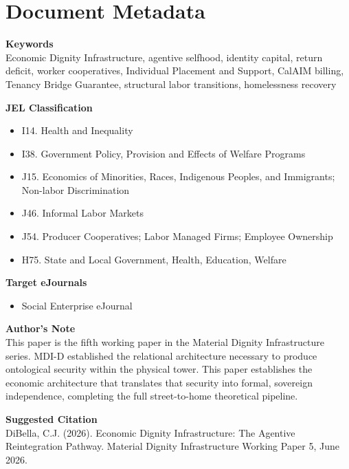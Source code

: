 \documentclass[12pt, letterpaper]{article}
\begin{document}
\section*{Document Metadata}

\noindent\textbf{Keywords}\\[1pt]
Economic Dignity Infrastructure, agentive selfhood, identity capital, return deficit, worker cooperatives, Individual Placement and Support, CalAIM billing, Tenancy Bridge Guarantee, structural labor transitions, homelessness recovery

\vspace{8pt}
\noindent\textbf{JEL Classification}
\begin{itemize}[nosep, before={\vspace{-8pt}}, leftmargin=2em]
    \item I14. Health and Inequality
    \item I38. Government Policy, Provision and Effects of Welfare Programs
    \item J15. Economics of Minorities, Races, Indigenous Peoples, and Immigrants; Non-labor Discrimination
    \item J46. Informal Labor Markets
    \item J54. Producer Cooperatives; Labor Managed Firms; Employee Ownership
    \item H75. State and Local Government, Health, Education, Welfare
\end{itemize}

\vspace{8pt}
\noindent\textbf{Target eJournals}
\begin{itemize}[nosep, before={\vspace{-8pt}}, leftmargin=2em]
    \item Social Enterprise eJournal
\end{itemize}

\vspace{8pt}
\noindent\textbf{Author's Note}\\[1pt]
This paper is the fifth working paper in the Material Dignity Infrastructure series. MDI-D established the relational architecture necessary to produce ontological security within the physical tower. This paper establishes the economic architecture that translates that security into formal, sovereign independence, completing the full street-to-home theoretical pipeline.

\vspace{8pt}
\noindent\textbf{Suggested Citation}\\[1pt]
DiBella, C.J. (2026). Economic Dignity Infrastructure: The Agentive Reintegration Pathway. Material Dignity Infrastructure Working Paper 5, June 2026.
\end{document}
